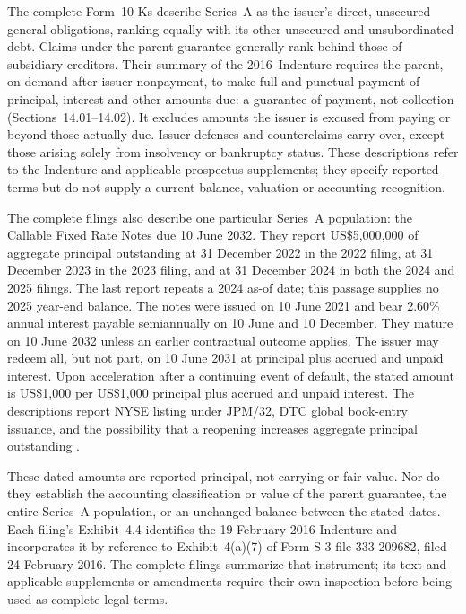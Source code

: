 \newpage

The complete Form~10-Ks describe Series~A as the issuer's direct, unsecured
general obligations, ranking equally with its other unsecured and
unsubordinated debt. Claims under the parent guarantee generally rank behind
those of subsidiary creditors. Their summary of the 2016~Indenture requires
the parent, on demand after issuer nonpayment, to make full and punctual
payment of principal, interest and other amounts due: a guarantee of payment,
not collection
(Sections~14.01--14.02). It excludes amounts the issuer is excused from paying
or beyond those actually due. Issuer defenses and counterclaims carry over,
except those arising solely from insolvency or bankruptcy status. These
descriptions refer to the Indenture and applicable prospectus supplements;
they specify reported terms but do not supply a current balance, valuation or
accounting recognition.

The complete filings also describe one particular Series~A population: the
Callable Fixed Rate Notes due 10 June 2032. They report US\$5,000,000 of
aggregate principal outstanding at 31 December 2022 in the 2022 filing, at
31 December 2023 in the 2023 filing, and at 31 December 2024 in both the 2024
and 2025 filings. The last report repeats a 2024 as-of date; this passage
supplies no 2025 year-end balance. The notes were issued on 10 June 2021 and bear 2.60\%
annual interest payable semiannually on 10 June and 10 December. They mature
on 10 June 2032 unless an earlier contractual outcome applies. The issuer
may redeem all, but not part, on 10 June 2031 at principal plus accrued and
unpaid interest. Upon acceleration after a continuing event of default, the
stated amount is US\$1,000 per US\$1,000 principal plus accrued and unpaid
interest. The descriptions report NYSE listing under JPM/32, DTC global
book-entry issuance, and the possibility that a reopening increases aggregate
principal outstanding \citep{jpmorgan2022tenk,jpmorgan2023tenk,jpmorgan2024tenk,jpmorgan2025tenk}.

These dated amounts are reported principal, not carrying or fair value. Nor do
they establish the accounting classification or value of the parent guarantee,
the entire Series~A population, or an unchanged balance between the stated
dates. Each filing's Exhibit~4.4 identifies the 19 February 2016 Indenture
and incorporates it by reference to Exhibit~4(a)(7) of Form S-3 file
333-209682, filed 24 February 2016. The complete filings summarize that
instrument; its text and applicable supplements or amendments require their
own inspection before being used as complete legal terms.

